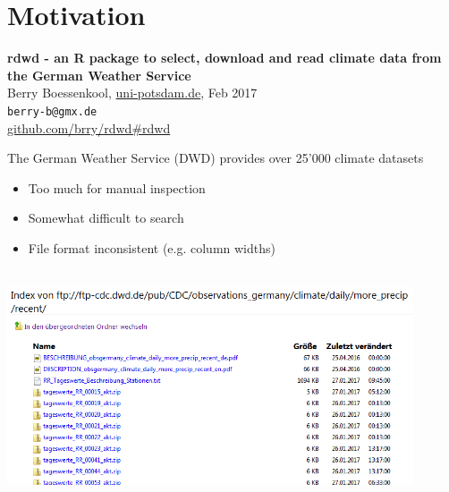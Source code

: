 \documentclass[compress, xcolor=dvipsnames]{beamer}\usepackage[]{graphicx}\usepackage[]{color}
\begin{document}
\centering



\section{Motivation}





\begin{frame}%
\vspace{1em}
\Large
\textbf{rdwd - an R package to select, download and read climate data from the German Weather Service}\\[2em]
\normalsize
Berry Boessenkool, \href{http://www.geo.uni-potsdam.de/geoecology.html}{uni-potsdam.de}, Feb 2017\\[1em]
\texttt{berry-b@gmx.de}\\[1em]
\href{https://github.com/brry/rdwd\#rdwd}{github.com/brry/rdwd\#rdwd}
\end{frame}


\begin{frame}{The German Weather Service (DWD) provides over 25'000 climate datasets}
\pause
\begin{itemize}%
\item Too much for manual inspection
\item Somewhat difficult to search
\item File format inconsistent (e.g. column widths)
\end{itemize}
\pause
{}\\[0.5em]
\includegraphics[width=0.9\textwidth]{dwd_ftp.PNG}\\
\end{frame}
\end{document}
